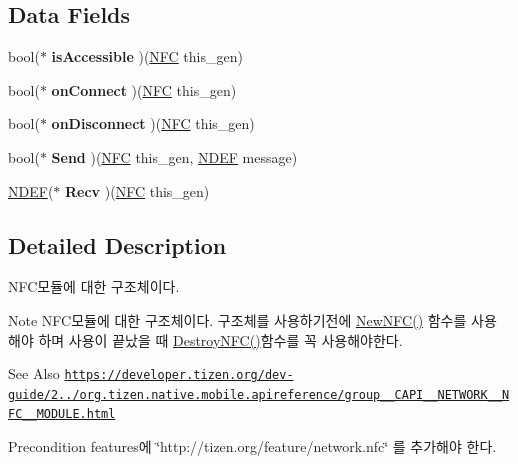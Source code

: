 \subsection*{Data Fields}
\begin{DoxyCompactItemize}
\item 
\hypertarget{struct__NFC_ac1c45ebcef1f0a82a2bc140a9a2d572b}{bool($\ast$ {\bfseries is\-Accessible} )(\hyperlink{struct__NFC}{N\-F\-C} this\-\_\-gen)}\label{struct__NFC_ac1c45ebcef1f0a82a2bc140a9a2d572b}

\item 
\hypertarget{struct__NFC_a070219e871b65c63119b2b9fcf2f7e40}{bool($\ast$ {\bfseries on\-Connect} )(\hyperlink{struct__NFC}{N\-F\-C} this\-\_\-gen)}\label{struct__NFC_a070219e871b65c63119b2b9fcf2f7e40}

\item 
\hypertarget{struct__NFC_a3c638b599b78d063fd8472ea015597e0}{bool($\ast$ {\bfseries on\-Disconnect} )(\hyperlink{struct__NFC}{N\-F\-C} this\-\_\-gen)}\label{struct__NFC_a3c638b599b78d063fd8472ea015597e0}

\item 
\hypertarget{struct__NFC_a66682eb598e5e0ae8ab320f1e936f775}{bool($\ast$ {\bfseries Send} )(\hyperlink{struct__NFC}{N\-F\-C} this\-\_\-gen, \hyperlink{NFC_8h_d2/dce/struct__NDEF}{N\-D\-E\-F} message)}\label{struct__NFC_a66682eb598e5e0ae8ab320f1e936f775}

\item 
\hypertarget{struct__NFC_a2c24741e6d306b941e4b30559e5b7a52}{\hyperlink{NFC_8h_d2/dce/struct__NDEF}{N\-D\-E\-F}($\ast$ {\bfseries Recv} )(\hyperlink{struct__NFC}{N\-F\-C} this\-\_\-gen)}\label{struct__NFC_a2c24741e6d306b941e4b30559e5b7a52}

\end{DoxyCompactItemize}


\subsection{Detailed Description}
N\-F\-C모듈에 대한 구조체이다. 

\begin{DoxyNote}{Note}
N\-F\-C모듈에 대한 구조체이다. 구조체를 사용하기전에 \hyperlink{NFC_8h_a03b543f63bf7d41bb184db9209d5cc9c}{New\-N\-F\-C()} 함수를 사용 해야 하며 사용이 끝났을 때 \hyperlink{NFC_8h_a1e5dc8f957d33cd59f30e03f113d63fe}{Destroy\-N\-F\-C()}함수를 꼭 사용해야한다. 
\end{DoxyNote}
\begin{DoxySeeAlso}{See Also}
\href{https://developer.tizen.org/dev-guide/2.3.0/org.tizen.native.mobile.apireference/group__CAPI__NETWORK__NFC__MODULE.html}{\tt https\-://developer.\-tizen.\-org/dev-\/guide/2../org.\-tizen.\-native.\-mobile.\-apireference/group\-\_\-\-\_\-\-C\-A\-P\-I\-\_\-\-\_\-\-N\-E\-T\-W\-O\-R\-K\-\_\-\-\_\-\-N\-F\-C\-\_\-\-\_\-\-M\-O\-D\-U\-L\-E.\-html} 
\end{DoxySeeAlso}
\begin{DoxyPrecond}{Precondition}
features에 \char`\"{}http\-://tizen.\-org/feature/network.\-nfc\char`\"{} 를 추가해야 한다. 
\end{DoxyPrecond}


